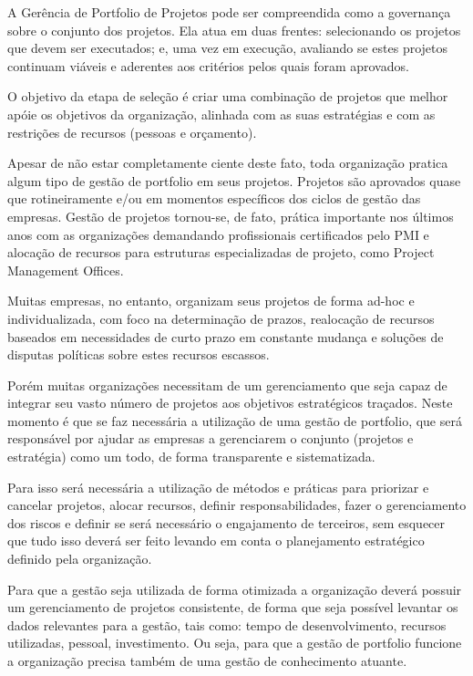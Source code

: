 \documentclass[12pt,a4paper,ruledheader,tocpage=prefix,floatnumber=continuous,pagestart=folhaderosto,font=times]{abnt}
\begin{document}
A Gerência de Portfolio de Projetos pode ser compreendida como a governança sobre o conjunto dos projetos. Ela atua em duas frentes: selecionando os 
projetos que devem ser executados; e, uma vez em execução, avaliando se estes projetos continuam viáveis e aderentes aos critérios pelos quais foram
aprovados.

O objetivo da etapa de seleção é criar uma combinação de projetos que melhor apóie os objetivos da organização, alinhada com as suas estratégias e 
com as restrições de recursos (pessoas e orçamento)\cite{LEVINE2010}.

Apesar de não estar completamente ciente deste fato, toda organização pratica algum tipo de gestão de portfolio em seus projetos. Projetos são aprovados 
quase que rotineiramente e/ou em momentos específicos dos ciclos de gestão das empresas. Gestão de projetos tornou-se, de fato, prática importante nos 
últimos anos com as organizações demandando profissionais certificados pelo PMI e alocação de recursos para estruturas especializadas de projeto, 
como Project Management Offices. 

Muitas empresas, no entanto, organizam seus projetos de forma ad-hoc e individualizada, com foco na determinação de prazos, realocação de recursos 
baseados em necessidades de curto prazo em constante mudança e soluções de disputas políticas sobre estes recursos escassos.

Porém muitas organizações necessitam de um gerenciamento que seja capaz de integrar seu vasto número de projetos aos objetivos estratégicos traçados.
Neste momento é que se faz necessária a utilização de uma gestão de portfolio, que será responsável por ajudar as empresas a gerenciarem o conjunto 
(projetos e estratégia) como um todo, de forma transparente e sistematizada. 

Para isso será necessária a utilização de métodos e práticas para priorizar e cancelar projetos, alocar recursos, definir responsabilidades, fazer o 
gerenciamento dos riscos e definir se será necessário o engajamento de terceiros, sem esquecer que tudo isso deverá ser feito levando em conta o 
planejamento estratégico definido pela organização.

Para que a gestão seja utilizada de forma otimizada a organização deverá possuir um gerenciamento de projetos consistente, de forma que seja possível 
levantar os dados relevantes para a gestão, tais como: tempo de desenvolvimento, recursos utilizadas, pessoal, investimento. Ou seja, para que a gestão 
de portfolio funcione a organização precisa também de uma gestão de conhecimento atuante.
\end{document}
